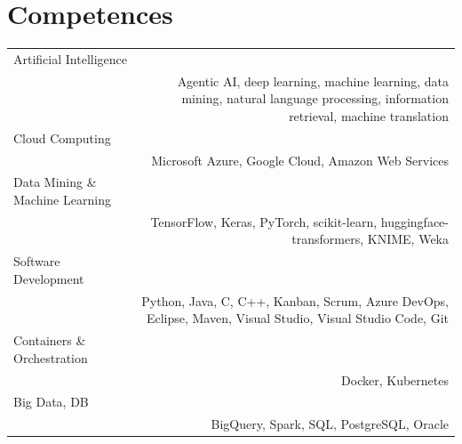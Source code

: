 \documentclass[10pt]{article}
\begin{document}
\section*{Competences}
\begin{tabular}{L!{\VRule}R}
Artificial Intelligence\\&Agentic AI, deep learning, machine learning, data mining, natural language processing, information retrieval, machine translation\\
Cloud Computing \\& Microsoft Azure, Google Cloud, Amazon Web Services\\
Data Mining \& Machine Learning\\&TensorFlow, Keras, PyTorch, scikit-learn, huggingface-transformers, KNIME, Weka\\
Software Development\\&Python, Java, C, C++, Kanban, Scrum, Azure DevOps, Eclipse, Maven, Visual Studio, Visual Studio Code, Git\\
Containers \& Orchestration\\ & Docker, Kubernetes\\
Big Data, DB\\& BigQuery, Spark, SQL, PostgreSQL, Oracle\\
\end{tabular}
\end{document}
